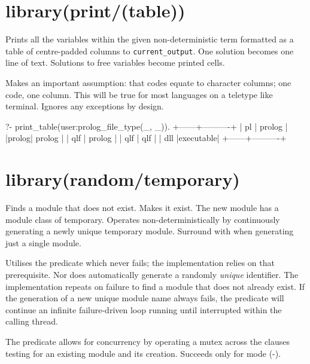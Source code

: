 \vspace{0.7cm}\chapter{library(print/(table))}\label{sec:table}

\begin{description}
Prints all the variables within the given non-deterministic 
term formatted as a table of centre-padded columns to
\verb$current_output$. One  solution becomes one line of text.
Solutions to free variables become printed cells.

Makes an important assumption: that codes equate to character
columns; one code, one column. This will be true for most languages
on a teletype like terminal. Ignores any exceptions by design.

\begin{code}
?- print_table(user:prolog_file_type(_, _)).
+------+----------+
|  pl  |  prolog  |
|prolog|  prolog  |
| qlf  |  prolog  |
| qlf  |   qlf    |
| dll  |executable|
+------+----------+
\end{code}

\end{description}

\chapter{library(random/temporary)}\label{sec:temporary}

\begin{description}
Finds a module that does not exist. Makes it exist. The new module
has a module class of temporary. Operates non-deterministically by
continuously generating a newly unique temporary module. Surround
with  when generating just a single module.

Utilises the  predicate which never fails; the implementation
relies on that prerequisite. Nor does  automatically generate
a randomly \textit{unique} identifier. The implementation repeats on
failure to find a module that does not already exist. If the
generation of a new unique module name always fails, the predicate
will continue an infinite failure-driven loop running until
interrupted within the calling thread.

The predicate allows for concurrency by operating a mutex across the
clauses testing for an existing module and its creation. Succeeds
only for mode (-).
\end{description}

